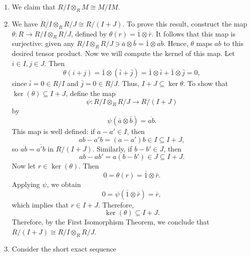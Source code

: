 \documentclass{article}
\begin{document}
	\begin{enumerate}[itemsep =-2pt,label = (\alph{*})]
		\item We claim that $R/I \otimes_{R} M \cong M/IM$. 
		\item We have $R/I \otimes_{R} R/J \cong R/(I + J)$. To prove this result, construct the map $\theta: R \to R/I \otimes_{R} R/J$, defined by $\theta(r) = \bar{1} \otimes \bar{r}$. It follows that this map is surjective: given any $R/I \otimes_{R} R/J \ni \bar{a} \otimes\bar{b} = \bar{1} \otimes \overline{ab}$. Hence, $\theta$ maps $ab$ to this desired tensor product. Now we will compute the kernel of this map. Let $i \in I, j \in J$. Then 
		\begin{equation*}
			\theta(i + j) = \bar{1} \otimes (\bar{i} + \bar{j}) = \bar{1}\otimes \bar{i} + \bar{1} \otimes \bar{j} = 0, 
		\end{equation*}
		since $\bar{i} = 0 \in R/I$ and $\bar{j} = 0 \in R/J$. Thus, $I + J \subseteq \ker{\theta}$. To show that $\ker(\theta)\subseteq I+J$, define the map
		\begin{equation*}
			\psi:R/I\otimes_R R/J\to R/(I+J)
		\end{equation*}
		by
		\begin{equation*}
			\psi(\bar{a}\otimes\bar{b})=\overline{ab}.
		\end{equation*}
		This map is well defined: if $a-a'\in I$, then
		\begin{equation*}
			ab-a'b=(a-a')b\in I\subseteq I+J,
		\end{equation*}
		so $\overline{ab}=\overline{a'b}$ in $R/(I+J)$. Similarly, if $b-b'\in J$, then
		\begin{equation*}
			ab-ab'=a(b-b')\in J\subseteq I+J.
		\end{equation*}
		Now let $r\in\ker(\theta)$. Then
		\begin{equation*}
			0=\theta(r)=\bar{1}\otimes\bar{r}.
		\end{equation*}
		Applying $\psi$, we obtain
		\begin{equation*}
			0=\psi(\bar{1}\otimes\bar{r})=\overline{r},
		\end{equation*}
		which implies that $r\in I+J$. Therefore,
		\begin{equation*}
			\ker(\theta)\subseteq I+J.
		\end{equation*}
		Therefore, by the First Isomorphism Theorem, we conclude that $R/(I + J) \cong R/I \otimes_{R} R/J$. 
		\item Consider the short exact sequence 
		\begin{equation*}

\end{equation*}
\end{enumerate}
\end{document}
